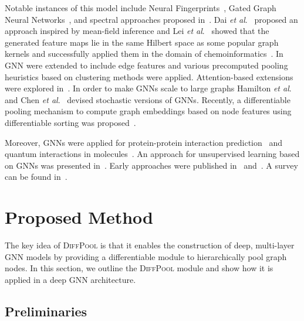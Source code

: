 \documentclass{article}
\newcommand{\name}{\textsc{DiffPool}\xspace}
\newcommand{\etal}{\textit{et al}.~}
\begin{document}
{Notable instances of this model include Neural
Fingerprints~\cite{Duv+2015}, Gated Graph Neural
Networks~\cite{Li+2016}, and spectral approaches proposed
in~\cite{Bru+2014,Def+2015,kipf2017semi}. Dai \etal\cite{dai2016discriminative}
proposed an approach inspired by mean-field inference
and Lei \etal\cite{Lei+2017} showed that the generated
feature maps lie in the same Hilbert space as some popular graph
kernels and successfully applied them in the domain of
chemoinformatics~\cite{Jin+2018}. In~\cite{simonovsky2017dynamic} GNN were extended to include edge features and various precomputed pooling heuristics based on clustering methods were applied. Attention-based extensions were explored in~\cite{Vel+2018}. In order to make GNNs scale to large graphs Hamilton \etal\cite{hamilton2017inductive} and Chen \etal\cite{Che+2018} devised stochastic versions of GNNs. Recently, a differentiable pooling mechanism to compute graph embeddings based on node features using differentiable sorting was proposed~\cite{zhang2018end}.

Moreover, GNNs were applied for protein-protein
interaction prediction~\cite{Fou+2017} and quantum interactions in
molecules~\cite{Sch+2017}. An approach for unsupervised learning based
on GNNs was presented in~\cite{Gar+2017}. Early
approaches were published in~\cite{Mer+2005} and~\cite{Sca+2009,
Sca+2009a}. A survey can be found in~\cite{Ham+2017a}.

}




 \section{Proposed Method}
\label{sec:proposed}

The key idea of \name is that it enables the construction of deep, multi-layer GNN models by providing a differentiable module to hierarchically pool graph nodes. 
In this section, we outline the \name module and show how it is applied in a deep GNN architecture.



\subsection{Preliminaries}
\label{sec:setting}
\end{document}
